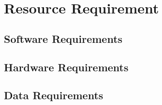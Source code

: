 \section{Resource Requirement}

\subsection{Software Requirements}

\subsection{Hardware Requirements}

\subsection{Data Requirements}